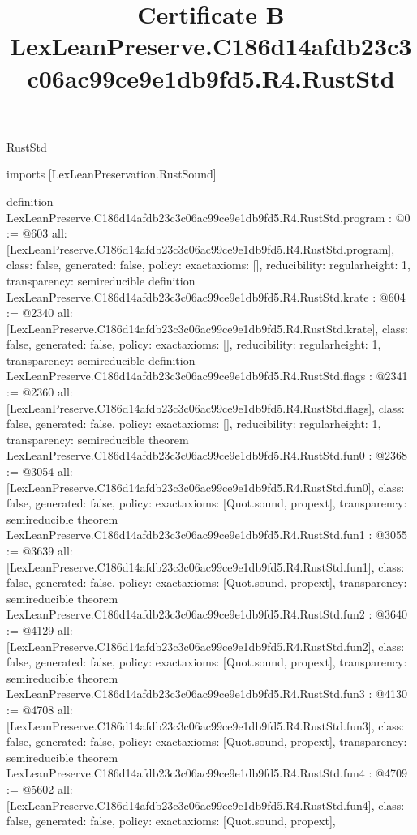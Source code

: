 \begin{lexlean}{RustStd}
\title{Certificate B LexLeanPreserve.C186d14afdb23c3c06ac99ce9e1db9fd5.R4.RustStd}
\begin{coremodule}
imports [LexLeanPreservation.RustSound]

definition LexLeanPreserve.C186d14afdb23c3c06ac99ce9e1db9fd5.R4.RustStd.program : @0 := @603 {
  all: [LexLeanPreserve.C186d14afdb23c3c06ac99ce9e1db9fd5.R4.RustStd.program],
  class: false,
  generated: false,
  policy: exact{axioms: []},
  reducibility: regular{height: 1},
  transparency: semireducible
}
definition LexLeanPreserve.C186d14afdb23c3c06ac99ce9e1db9fd5.R4.RustStd.krate : @604 := @2340 {
  all: [LexLeanPreserve.C186d14afdb23c3c06ac99ce9e1db9fd5.R4.RustStd.krate],
  class: false,
  generated: false,
  policy: exact{axioms: []},
  reducibility: regular{height: 1},
  transparency: semireducible
}
definition LexLeanPreserve.C186d14afdb23c3c06ac99ce9e1db9fd5.R4.RustStd.flags : @2341 := @2360 {
  all: [LexLeanPreserve.C186d14afdb23c3c06ac99ce9e1db9fd5.R4.RustStd.flags],
  class: false,
  generated: false,
  policy: exact{axioms: []},
  reducibility: regular{height: 1},
  transparency: semireducible
}
theorem LexLeanPreserve.C186d14afdb23c3c06ac99ce9e1db9fd5.R4.RustStd.fun0 : @2368 := @3054 {
  all: [LexLeanPreserve.C186d14afdb23c3c06ac99ce9e1db9fd5.R4.RustStd.fun0],
  class: false,
  generated: false,
  policy: exact{axioms: [Quot.sound, propext]},
  transparency: semireducible
}
theorem LexLeanPreserve.C186d14afdb23c3c06ac99ce9e1db9fd5.R4.RustStd.fun1 : @3055 := @3639 {
  all: [LexLeanPreserve.C186d14afdb23c3c06ac99ce9e1db9fd5.R4.RustStd.fun1],
  class: false,
  generated: false,
  policy: exact{axioms: [Quot.sound, propext]},
  transparency: semireducible
}
theorem LexLeanPreserve.C186d14afdb23c3c06ac99ce9e1db9fd5.R4.RustStd.fun2 : @3640 := @4129 {
  all: [LexLeanPreserve.C186d14afdb23c3c06ac99ce9e1db9fd5.R4.RustStd.fun2],
  class: false,
  generated: false,
  policy: exact{axioms: [Quot.sound, propext]},
  transparency: semireducible
}
theorem LexLeanPreserve.C186d14afdb23c3c06ac99ce9e1db9fd5.R4.RustStd.fun3 : @4130 := @4708 {
  all: [LexLeanPreserve.C186d14afdb23c3c06ac99ce9e1db9fd5.R4.RustStd.fun3],
  class: false,
  generated: false,
  policy: exact{axioms: [Quot.sound, propext]},
  transparency: semireducible
}
theorem LexLeanPreserve.C186d14afdb23c3c06ac99ce9e1db9fd5.R4.RustStd.fun4 : @4709 := @5602 {
  all: [LexLeanPreserve.C186d14afdb23c3c06ac99ce9e1db9fd5.R4.RustStd.fun4],
  class: false,
  generated: false,
  policy: exact{axioms: [Quot.sound, propext]},
}
\end{coremodule}
\end{lexlean}
